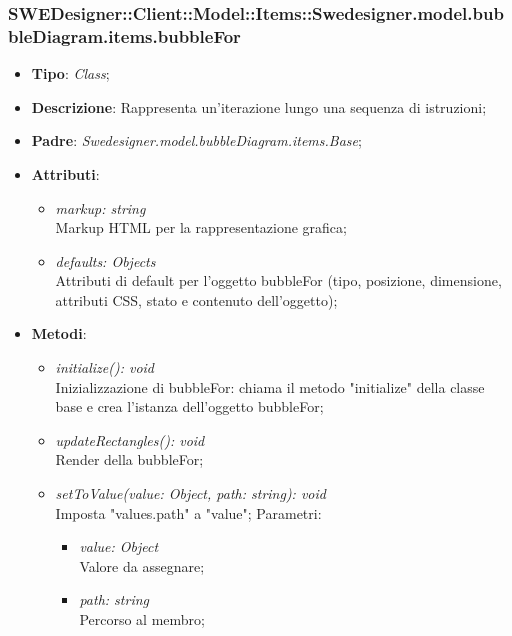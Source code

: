 \documentclass[../DefinizioneDiProdotto.tex]{subfiles}
\begin{document}
			\subsubsection{SWEDesigner::Client::Model::Items::Swedesigner.model.bubbleDiagram.items.bubbleFor}
			\hypertarget{SWEDesigner::Client::Model::Items::Swedesigner.model.bubbleDiagram.items.bubbleFor}{}
			\begin{itemize}
				\item \textbf{Tipo}: \emph{Class};
				\item \textbf{Descrizione}: Rappresenta un'iterazione lungo una sequenza di istruzioni;
				\item \textbf{Padre}: \emph{Swedesigner.model.bubbleDiagram.items.Base};
				\item \textbf{Attributi}:
				\begin{itemize}
					\item \emph{markup: string}\\
					Markup HTML per la rappresentazione grafica;
					\item \emph{defaults: Objects}\\
					Attributi di default per l'oggetto bubbleFor (tipo, posizione, dimensione, attributi CSS, stato e contenuto dell'oggetto);
				\end{itemize}
				\item \textbf{Metodi}:
				\begin{itemize}
					\item \emph{initialize(): void}\\
					Inizializzazione di bubbleFor: chiama il metodo "initialize" della classe base e crea l'istanza dell'oggetto bubbleFor;
					\item \emph{updateRectangles(): void}\\
					Render della bubbleFor;
					\item \emph{setToValue(value: Object, path: string): void}\\
					Imposta "values.path" a "value";
					Parametri:
					\begin{itemize}
						\item \emph{value: Object} \\
						Valore da assegnare;
						\item \emph{path: string} \\
						Percorso al membro;
					\end{itemize}
				\end{itemize}
			\end{itemize}
			
\end{document}
